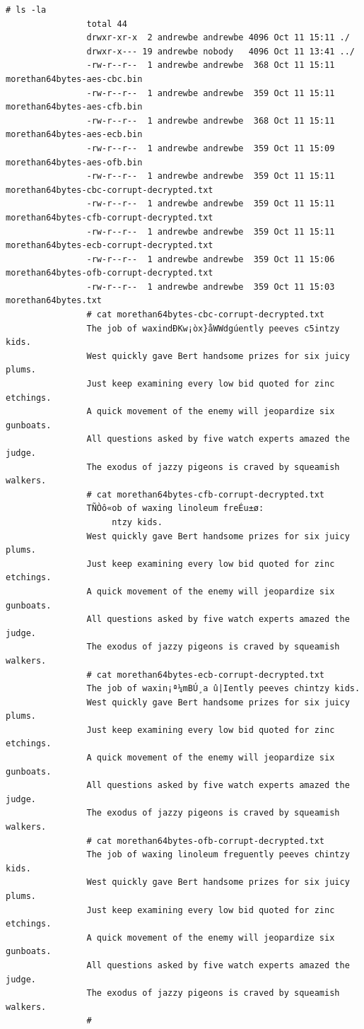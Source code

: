 \begin{lstlisting}[label={Shell Commands},caption={Task 1}]
				# ls -la
				total 44
				drwxr-xr-x  2 andrewbe andrewbe 4096 Oct 11 15:11 ./
				drwxr-x--- 19 andrewbe nobody   4096 Oct 11 13:41 ../
				-rw-r--r--  1 andrewbe andrewbe  368 Oct 11 15:11 morethan64bytes-aes-cbc.bin
				-rw-r--r--  1 andrewbe andrewbe  359 Oct 11 15:11 morethan64bytes-aes-cfb.bin
				-rw-r--r--  1 andrewbe andrewbe  368 Oct 11 15:11 morethan64bytes-aes-ecb.bin
				-rw-r--r--  1 andrewbe andrewbe  359 Oct 11 15:09 morethan64bytes-aes-ofb.bin
				-rw-r--r--  1 andrewbe andrewbe  359 Oct 11 15:11 morethan64bytes-cbc-corrupt-decrypted.txt
				-rw-r--r--  1 andrewbe andrewbe  359 Oct 11 15:11 morethan64bytes-cfb-corrupt-decrypted.txt
				-rw-r--r--  1 andrewbe andrewbe  359 Oct 11 15:11 morethan64bytes-ecb-corrupt-decrypted.txt
				-rw-r--r--  1 andrewbe andrewbe  359 Oct 11 15:06 morethan64bytes-ofb-corrupt-decrypted.txt
				-rw-r--r--  1 andrewbe andrewbe  359 Oct 11 15:03 morethan64bytes.txt
				# cat morethan64bytes-cbc-corrupt-decrypted.txt
				The job of waxindÐKw¡òx}åWWdgúently peeves c5intzy kids.
				West quickly gave Bert handsome prizes for six juicy plums.
				Just keep examining every low bid quoted for zinc etchings.
				A quick movement of the enemy will jeopardize six gunboats.
				All questions asked by five watch experts amazed the judge.
				The exodus of jazzy pigeons is craved by squeamish walkers.
				# cat morethan64bytes-cfb-corrupt-decrypted.txt
				TÑÒô«ob of waxing linoleum freÉu±ø:
					 ntzy kids.
				West quickly gave Bert handsome prizes for six juicy plums.
				Just keep examining every low bid quoted for zinc etchings.
				A quick movement of the enemy will jeopardize six gunboats.
				All questions asked by five watch experts amazed the judge.
				The exodus of jazzy pigeons is craved by squeamish walkers.
				# cat morethan64bytes-ecb-corrupt-decrypted.txt
				The job of waxin¡ª¼mBÚ¸a û|Iently peeves chintzy kids.
				West quickly gave Bert handsome prizes for six juicy plums.
				Just keep examining every low bid quoted for zinc etchings.
				A quick movement of the enemy will jeopardize six gunboats.
				All questions asked by five watch experts amazed the judge.
				The exodus of jazzy pigeons is craved by squeamish walkers.
				# cat morethan64bytes-ofb-corrupt-decrypted.txt
				The job of waxing linoleum freguently peeves chintzy kids.
				West quickly gave Bert handsome prizes for six juicy plums.
				Just keep examining every low bid quoted for zinc etchings.
				A quick movement of the enemy will jeopardize six gunboats.
				All questions asked by five watch experts amazed the judge.
				The exodus of jazzy pigeons is craved by squeamish walkers.
				#
			\end{lstlisting}
			
